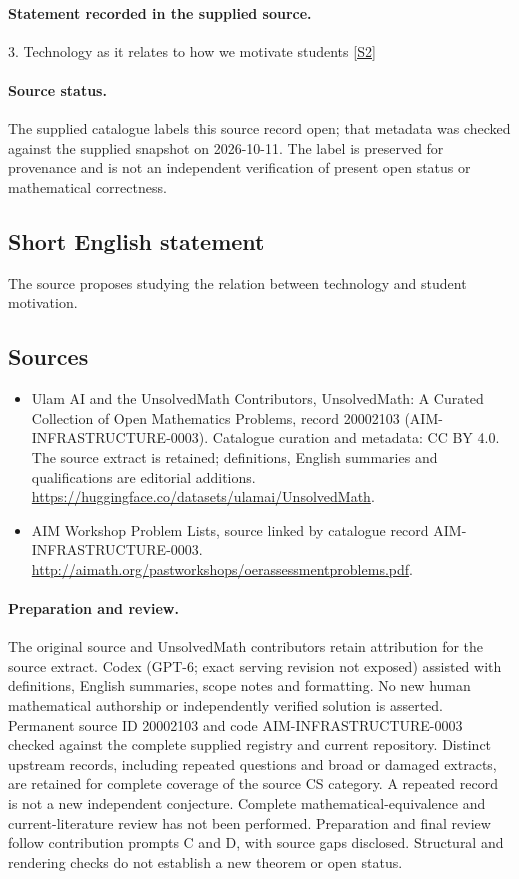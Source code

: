 \documentclass[11pt]{article}
\begin{document}
\paragraph{Statement recorded in the supplied source.}
3. Technology as it relates to how we motivate students \href{http://aimath.org/pastworkshops/oerassessmentproblems.pdf}{[S2]}
\paragraph{Source status.}
The supplied catalogue labels this source record open; that metadata was checked against the supplied snapshot on 2026-10-11. The label is preserved for provenance and is not an independent verification of present open status or mathematical correctness.
\subsection{Short English statement}
The source proposes studying the relation between technology and student motivation.
\subsection{Sources}
\begin{itemize}
\item[S1] Ulam AI and the UnsolvedMath Contributors, UnsolvedMath: A Curated Collection of Open Mathematics Problems, record 20002103 (AIM-INFRASTRUCTURE-0003). Catalogue curation and metadata: CC BY 4.0. The source extract is retained; definitions, English summaries and qualifications are editorial additions.
\url{https://huggingface.co/datasets/ulamai/UnsolvedMath}.
\item[S2] AIM Workshop Problem Lists, source linked by catalogue record AIM-INFRASTRUCTURE-0003.
\url{http://aimath.org/pastworkshops/oerassessmentproblems.pdf}.
\end{itemize}
\paragraph{Preparation and review.}
The original source and UnsolvedMath contributors retain attribution for the source extract. Codex (GPT-6; exact serving revision not exposed) assisted with definitions, English summaries, scope notes and formatting. No new human mathematical authorship or independently verified solution is asserted. Permanent source ID 20002103 and code AIM-INFRASTRUCTURE-0003 checked against the complete supplied registry and current repository. Distinct upstream records, including repeated questions and broad or damaged extracts, are retained for complete coverage of the source CS category. A repeated record is not a new independent conjecture. Complete mathematical-equivalence and current-literature review has not been performed. Preparation and final review follow contribution prompts C and D, with source gaps disclosed. Structural and rendering checks do not establish a new theorem or open status.
\label{end:20002103}
\end{document}

